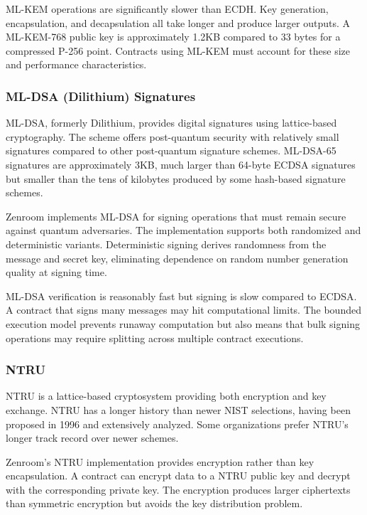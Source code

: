 ML-KEM operations are significantly slower than ECDH. Key generation,
encapsulation, and decapsulation all take longer and produce larger
outputs. A ML-KEM-768 public key is approximately 1.2KB compared to 33
bytes for a compressed P-256 point. Contracts using ML-KEM must
account for these size and performance characteristics.

\subsubsection{ML-DSA (Dilithium) Signatures}

ML-DSA, formerly Dilithium, provides digital signatures using
lattice-based cryptography. The scheme offers post-quantum security
with relatively small signatures compared to other post-quantum
signature schemes. ML-DSA-65 signatures are approximately 3KB, much
larger than 64-byte ECDSA signatures but smaller than the tens of
kilobytes produced by some hash-based signature schemes.

Zenroom implements ML-DSA for signing operations that must remain
secure against quantum adversaries. The implementation supports both
randomized and deterministic variants. Deterministic signing derives
randomness from the message and secret key, eliminating dependence on
random number generation quality at signing time.

ML-DSA verification is reasonably fast but signing is slow compared to
ECDSA. A contract that signs many messages may hit computational
limits. The bounded execution model prevents runaway computation but
also means that bulk signing operations may require splitting across
multiple contract executions.

\subsubsection{NTRU}

NTRU is a lattice-based cryptosystem providing both encryption and key
exchange. NTRU has a longer history than newer NIST selections, having
been proposed in 1996 and extensively analyzed. Some organizations
prefer NTRU's longer track record over newer schemes.

Zenroom's NTRU implementation provides encryption rather than key
encapsulation. A contract can encrypt data to a NTRU public key and
decrypt with the corresponding private key. The encryption produces
larger ciphertexts than symmetric encryption but avoids the key
distribution problem.

